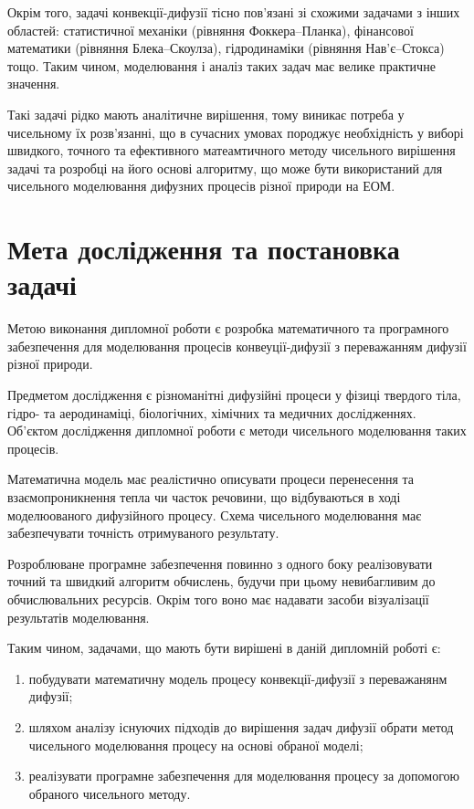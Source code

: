 \documentclass{diploma}
\begin{document}
Окрім того, задачі конвекції-дифузії тісно пов'язані зі схожими задачами з інших областей: статистичної механіки (рівняння Фоккера--Планка), фінансової математики (рівняння Блека--Скоулза), гідродинаміки (рівняння Нав'є--Стокса) тощо. Таким чином, моделювання і аналіз таких задач має велике практичне значення.

Такі задачі рідко мають аналітичне вирішення, тому виникає потреба у чисельному їх розв'язанні, що в сучасних умовах породжує необхідність у виборі швидкого, точного та ефективного матеамтичного методу чисельного вирішення задачі та розробці на його основі алгоритму, що може бути використаний для чисельного моделювання дифузних процесів різної природи на ЕОМ.

\chapter{Мета дослідження та постановка задачі}
Метою виконання дипломної роботи є розробка математичного та програмного забезпечення для моделювання процесів конвеуції-дифузії з переважанням дифузії різної природи.

Предметом дослідження є різноманітні дифузійні процеси у фізиці твердого тіла, гідро- та аеродинаміці, біологічних, хімічних та медичних дослідженнях. Об'єктом дослідження дипломної роботи є методи чисельного моделювання таких процесів.

Математична модель має реалістично описувати процеси перенесення та взаємопроникнення тепла чи часток речовини, що відбуваються в ході моделюованого дифузійного процесу. Схема чисельного моделювання має забезпечувати точність отримуваного результату.

Розроблюване програмне забезпечення повинно з одного боку реалізовувати точний та швидкий алгоритм обчислень, будучи при цьому невибагливим до обчислювальних ресурсів. Окрім того воно має надавати засоби візуалізації результатів моделювання.

Таким чином, задачами, що мають бути вирішені в даній дипломній роботі є:
\begin{enumerate}
	\item побудувати математичну модель процесу конвекції-дифузії з переважанянм дифузії;
	\item шляхом аналізу існуючих підходів до вирішення задач дифузії обрати метод чисельного моделювання процесу на основі обраної моделі;
	\item реалізувати програмне забезпечення для моделювання процесу за допомогою обраного чисельного методу.
\end{enumerate}
\end{document}
